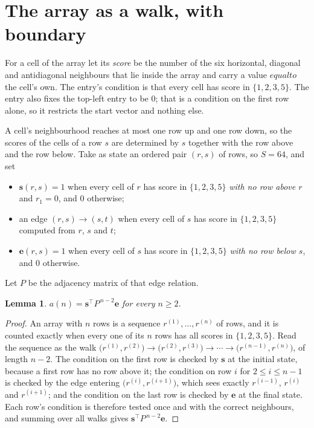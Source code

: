 \documentclass[11pt,a4paper]{article}
\theoremstyle{plain}
\newtheorem{lemma}[theorem]{Lemma}
\theoremstyle{definition}
\begin{document}
\section{The array as a walk, with boundary}

For a cell of the array let its \emph{score} be the number of the six horizontal, diagonal and antidiagonal neighbours that lie inside
the array and carry a value $equal to$ the cell's own. The entry's condition is that every cell
has score in $\{1,2,3,5\}$. The entry also fixes the top-left entry to be $0$; that is a condition on the first row alone, so it restricts the start vector and nothing else.

A cell's neighbourhood reaches at most one row up and one row down, so the scores of the
cells of a row $s$ are determined by $s$ together with the row above and the row below.
Take as state an ordered pair $(r,s)$ of rows, so $S=64$, and set
\begin{itemize}
\item $\mathbf{s}(r,s)=1$ when every cell of $r$ has score in $\{1,2,3,5\}$ \emph{with no row
above $r$} and $r_1=0$, and $0$ otherwise;
\item an edge $(r,s)\to(s,t)$ when every cell of $s$ has score in $\{1,2,3,5\}$ computed from
$r$, $s$ and $t$;
\item $\mathbf{e}(r,s)=1$ when every cell of $s$ has score in $\{1,2,3,5\}$ \emph{with no row
below $s$}, and $0$ otherwise.
\end{itemize}
Let $P$ be the adjacency matrix of that edge relation.

\begin{lemma}\label{lem:walk}
$a(n)=\mathbf{s}^{\!\top}P^{\,n-2}\mathbf{e}$ for every $n\ge2$.
\end{lemma}

\begin{proof}
An array with $n$ rows is a sequence $r^{(1)},\dots,r^{(n)}$ of rows, and it is counted
exactly when every one of its $n$ rows has all scores in $\{1,2,3,5\}$. Read the sequence as the
walk $\bigl(r^{(1)},r^{(2)}\bigr)\to\bigl(r^{(2)},r^{(3)}\bigr)\to\cdots\to
\bigl(r^{(n-1)},r^{(n)}\bigr)$, of length $n-2$. The condition on the first row is
checked by $\mathbf{s}$ at the initial state, because a first row has no row above it; the
condition on row $i$ for $2\le i\le n-1$ is checked by the edge entering
$\bigl(r^{(i)},r^{(i+1)}\bigr)$, which sees exactly $r^{(i-1)}$, $r^{(i)}$ and
$r^{(i+1)}$; and the condition on the last row is checked by $\mathbf{e}$ at the final
state. Each row's condition is therefore tested once and with the correct neighbours, and
summing over all walks gives $\mathbf{s}^{\!\top}P^{\,n-2}\mathbf{e}$.
\end{proof}
\end{document}
